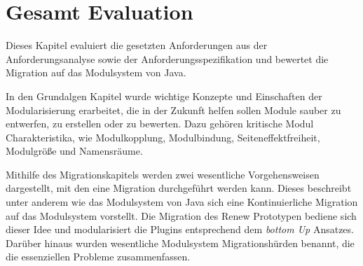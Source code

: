\chapter{Gesamt Evaluation}
Dieses Kapitel evaluiert die gesetzten Anforderungen aus der Anforderungsanalyse sowie der Anforderungsspezifikation und bewertet die Migration auf das Modulsystem von Java.\bigbreak	

In den Grundalgen Kapitel wurde wichtige Konzepte und Einschaften der Modularisierung erarbeitet, die in der Zukunft helfen sollen Module sauber zu entwerfen, zu erstellen oder zu bewerten. Dazu gehören kritische Modul Charakteristika, wie Modulkopplung, Modulbindung, Seiteneﬀektfreiheit, Modulgröße und Namensräume. \bigbreak

Mithilfe des Migrationskapitels werden zwei wesentliche Vorgehensweisen dargestellt, mit den eine Migration durchgeführt werden kann. Dieses beschreibt unter anderem wie das Modulsystem von Java sich eine Kontinuierliche Migration auf das Modulsystem vorstellt. \newline
Die Migration des Renew Prototypen bediene sich dieser Idee und modularisiert die Plugins entsprechend dem \textit{bottom Up} Ansatzes. Darüber hinaus wurden wesentliche Modulsystem Migrationshürden benannt, die die essenziellen Probleme zusammenfassen. \bigbreak

